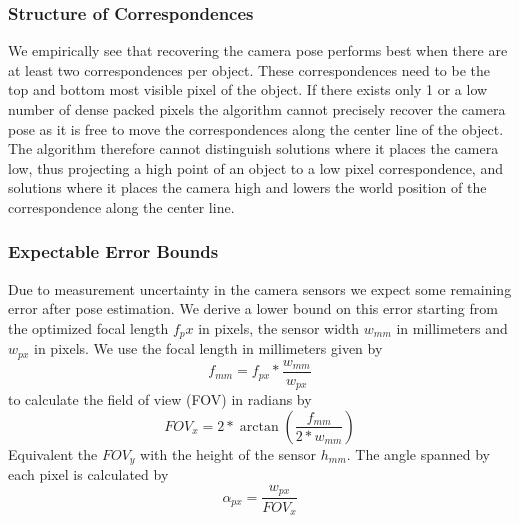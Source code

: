 
\subsubsection{Structure of Correspondences}
We empirically see that recovering the camera pose performs best when there are at least two correspondences per object.
These correspondences need to be the top and bottom most visible pixel of the object.
If there exists only 1 or a low number of dense packed pixels the algorithm cannot precisely recover the camera pose as it is free to move the correspondences along the center line of the object.
The algorithm therefore cannot distinguish solutions where it places the camera low, thus projecting a high point of an object to a low pixel correspondence, and solutions where it places the camera high and lowers the world position of the correspondence along the center line.




\subsubsection{Expectable Error Bounds}
\label{sec:static_calibration_expectable_error}

Due to measurement uncertainty in the camera sensors we expect some remaining error after pose estimation.
We derive a lower bound on this error starting from the optimized focal length $f_px$ in pixels, the sensor width $w_{mm}$ in millimeters and $w_{px}$ in pixels.
We use the focal length in millimeters given by 
\begin{equation}
  f_{mm} = f_{px} * \frac{w_{mm}}{w_{px}}
\end{equation}
to calculate the field of view (FOV) in radians by 
\begin{equation}
  FOV_x = 2 * \arctan \left(\frac{f_{mm}}{2 * w_{mm}}\right)
\end{equation} 
Equivalent the $FOV_y$ with the height of the sensor $h_{mm}$.
The angle spanned by each pixel is calculated by
\begin{equation}
  \alpha_{px} = \frac{w_{px}}{FOV_x}
\end{equation} 

